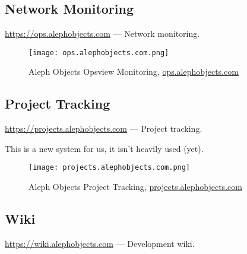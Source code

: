 \subsection{Network Monitoring}
\url{https://ops.alephobjects.com} --- Network monitoring.
\begin{figure}[h!]
\texttt{[image: ops.alephobjects.com.png]}
 \caption{Aleph Objects Opsview Monitoring, \href{ops.alephobjects.com}{ops.alephobjects.com}}
 \label{fig:opsalephobjectscom}
\end{figure}

\subsection{Project Tracking}
\url{https://projects.alephobjects.com} --- Project tracking.

This is a new system for us, it isn't heavily used (yet).

\begin{figure}[h!]
\texttt{[image: projects.alephobjects.com.png]}
 \caption{Aleph Objects Project Tracking, \href{projects.alephobjects.com}{projects.alephobjects.com}}
 \label{fig:projectsalephobjectscom}
\end{figure}

\subsection{Wiki}
\url{https://wiki.alephobjects.com} --- Development wiki.

